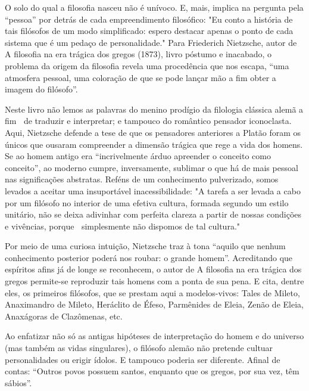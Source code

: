 O solo do qual a filosofia nasceu não é unívoco. E, mais, implica na pergunta pela “pessoa” por detrás de cada empreendimento filosófico: "Eu conto a história de tais filósofos de um modo simplificado: espero destacar apenas o ponto de cada sistema que é um pedaço de personalidade." Para Friederich Nietzsche, autor de A filosofia na era trágica dos gregos (1873), livro póstumo e inacabado, o problema da origem da filosofia revela uma procedência que nos escapa, “uma atmosfera pessoal, uma coloração de que se pode lançar mão a fim obter a imagem do filósofo”.

Neste livro não lemos as palavras do menino prodígio da filologia clássica alemã a fim 􏰃􏰀de traduzir e interpretar; e tampouco do romântico pensador iconoclasta. Aqui, Nietzsche defende a tese de que os pensadores anteriores a Platão foram os únicos que ousaram compreender a dimensão trágica que rege a vida dos homens. Se ao homem antigo era “incrivelmente árduo apreender o conceito como conceito”, ao moderno cumpre, inversamente, sublimar o que há de mais pessoal nas significações abstratas. Reféns de um conhecimento pulverizado, somos levados a aceitar uma insuportável inacessibilidade: "A tarefa a ser levada a cabo por um filósofo no interior de uma efetiva cultura, formada segundo um estilo unitário, não se deixa adivinhar com perfeita clareza a partir de nossas condições e vivências, porque 􏰂􏰁simplesmente não dispomos de tal cultura."

Por meio de uma curiosa intuição, Nietzsche traz à tona “aquilo que nenhum conhecimento posterior poderá nos roubar: o grande homem”. Acreditando que espíritos afins já de longe se reconhecem, o autor de A filosofia na era trágica dos gregos permite-se reproduzir tais homens com a ponta de sua pena. E cita, dentre eles, os primeiros filósofos, que se prestam aqui a modelos-vivos: Tales de Mileto, Anaximandro de Mileto, Heráclito de Éfeso, Parmênides de Eleia, Zenão de Eleia, Anaxágoras de Clazômenas, etc.

Ao enfatizar não só as antigas hipóteses de interpretação do homem e do universo (mas também as vidas singulares), o filósofo alemão não pretende cultuar personalidades ou erigir ídolos. E tampouco poderia ser diferente. Afinal de contas: ``Outros povos possuem santos, enquanto que os gregos, por sua vez, têm sábios''.